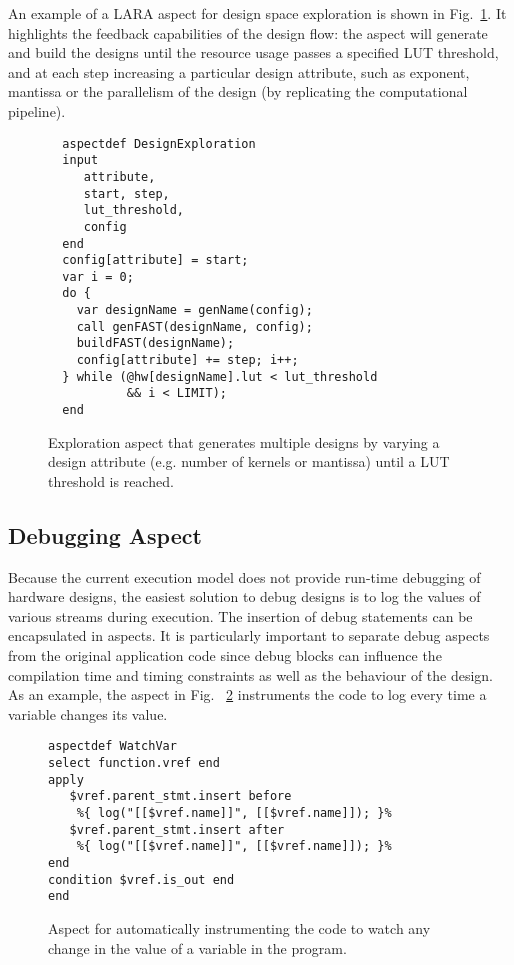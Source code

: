 An example of a LARA aspect for design space exploration is
shown in Fig.~\ref{fig:aspect-exploration}. It highlights the feedback capabilities of the design
flow: the aspect will generate and build the \MAXC{} designs until the
resource usage passes a specified LUT threshold, and at each step
increasing a particular design attribute, such as exponent, mantissa or the parallelism of the design (by replicating the computational pipeline).

\lstset{style=lara}
\begin{figure}[!h]
\begin{lstlisting}
  aspectdef DesignExploration
  input
     attribute,
     start, step,
     lut_threshold,
     config
  end
  config[attribute] = start;
  var i = 0;
  do {
    var designName = genName(config);
    call genFAST(designName, config);
    buildFAST(designName);
    config[attribute] += step; i++;
  } while (@hw[designName].lut < lut_threshold
           && i < LIMIT);
  end
\end{lstlisting}
\caption{Exploration aspect that generates multiple \MAXC{} designs by varying a design attribute (e.g. number of kernels or mantissa) until a LUT threshold is reached.}
\label{fig:aspect-exploration}
\end{figure}


\subsection{Debugging Aspect}
\label{sect:asp_debug}
Because the current execution model does not provide run-time debugging
of hardware designs, the easiest solution to debug designs is to log
the values of various streams during execution. The insertion of debug
statements can be encapsulated in aspects. It is particularly
important to separate debug aspects from the original application code
since debug blocks can influence the compilation time and timing
constraints as well as the behaviour of the design. As an example,
the aspect in Fig. ~\ref{fig:aspect-debug} instruments the code to log every time a variable changes its value.

\lstset{style=lara}
\begin{figure}[!h]
  \centering
\begin{lstlisting}
aspectdef WatchVar
select function.vref end
apply
   $vref.parent_stmt.insert before
    %{ log("[[$vref.name]]", [[$vref.name]]); }%
   $vref.parent_stmt.insert after
    %{ log("[[$vref.name]]", [[$vref.name]]); }%
end
condition $vref.is_out end
end
\end{lstlisting}
  \caption{Aspect for automatically instrumenting the code to watch any change in the value of a  variable in the program.}
  \label{fig:aspect-debug}
\end{figure}
